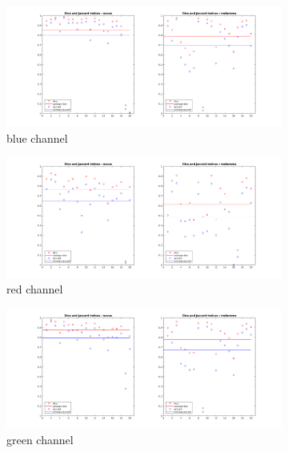\documentclass[a4paper,10pt]{article}
\begin{document}
\begin{figure}

  \begin{subfigure}{0.7\textwidth}
    \includegraphics[width=0.9\linewidth]{../results/color-channel-influence/base-evaluation/otsu-dice-jaccard-B.png} 
    \caption{blue channel}
    \label{fig:otsu-blue}
  \end{subfigure}
  \begin{subfigure}{0.7\textwidth}
    \includegraphics[width=0.9\linewidth]{../results/color-channel-influence/base-evaluation/otsu-dice-jaccard-R.png}
    \caption{red channel}
    \label{fig:otsu-red}
  \end{subfigure}
  \begin{subfigure}{0.7\textwidth}
    \includegraphics[width=0.9\linewidth]{../results/color-channel-influence/base-evaluation/otsu-dice-jaccard-G.png}
    \caption{green channel}
    \label{fig:otsu-green}
  \end{subfigure}
  \begin{subfigure}{0.7\textwidth}

\end{subfigure}
\end{figure}
\end{document}
